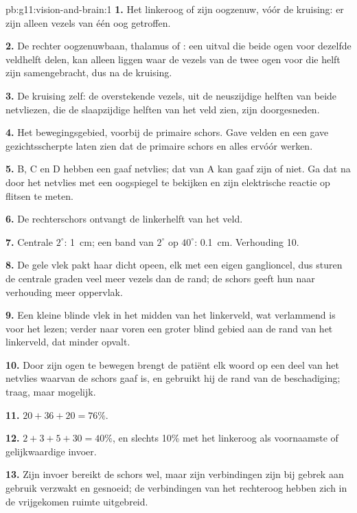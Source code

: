 \begin{solution}{pb:g11:vision-and-brain:1}
\textbf{1.} Het linkeroog of zijn oogzenuw, vóór de kruising: er zijn
alleen vezels van één oog getroffen.

\textbf{2.} De rechter oogzenuwbaan, thalamus of : een
uitval die beide ogen voor dezelfde veldhelft delen, kan alleen liggen
waar de vezels van de twee ogen voor die helft zijn samengebracht, dus na
de kruising.

\textbf{3.} De kruising zelf: de overstekende vezels, uit de neuszijdige
helften van beide netvliezen, die de slaapzijdige helften van het veld
zien, zijn doorgesneden.

\textbf{4.} Het bewegingsgebied, voorbij de primaire schors. Gave velden
en een gave gezichtsscherpte laten zien dat de primaire schors en alles
ervóór werken.

\textbf{5.} B, C en D hebben een gaaf netvlies; dat van A kan gaaf zijn of
niet. Ga dat na door het netvlies met een oogspiegel te bekijken en zijn
elektrische reactie op flitsen te meten.

\textbf{6.} De rechterschors ontvangt de linkerhelft van het veld.

\textbf{7.} Centrale $2^\circ$: \qty{1}{cm}; een band van $2^\circ$ op
$40^\circ$: \qty{0.1}{cm}. Verhouding 10.

\textbf{8.} De gele vlek pakt haar  dicht opeen, elk met een
eigen ganglioncel, dus sturen de centrale graden veel meer vezels dan de
rand; de schors geeft hun naar verhouding meer oppervlak.

\textbf{9.} Een kleine blinde vlek in het midden van het linkerveld, wat
verlammend is voor het lezen; verder naar voren een groter blind gebied
aan de rand van het linkerveld, dat minder opvalt.

\textbf{10.} Door zijn ogen te bewegen brengt de patiënt elk woord op een
deel van het netvlies waarvan de schors gaaf is, en gebruikt hij de rand
van de beschadiging; traag, maar mogelijk.

\textbf{11.} $20 + 36 + 20 = 76\%$.

\textbf{12.} $2 + 3 + 5 + 30 = 40\%$, en slechts 10\% met het linkeroog
als voornaamste of gelijkwaardige invoer.

\textbf{13.} Zijn invoer bereikt de schors wel, maar zijn verbindingen
zijn bij gebrek aan gebruik verzwakt en gesnoeid; de verbindingen van het
rechteroog hebben zich in de vrijgekomen ruimte uitgebreid.


\end{solution}
